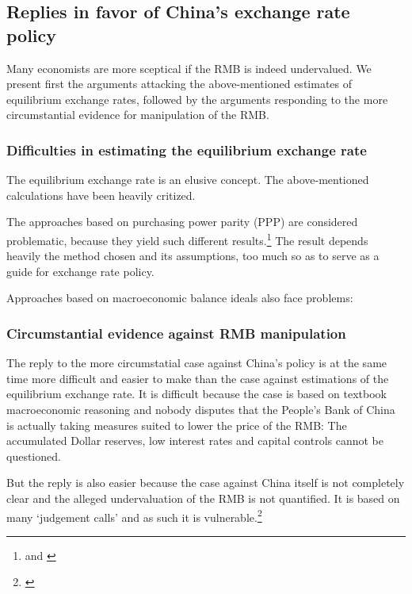 \subsection{Replies in favor of China's exchange rate policy}

Many economists are more sceptical if the RMB is indeed undervalued. We present first the arguments attacking the above-mentioned estimates of equilibrium exchange rates, followed by the arguments responding to the more circumstantial evidence for manipulation of the RMB.

\subsubsection{Difficulties in estimating the equilibrium exchange rate}

The equilibrium exchange rate is an elusive concept. The above-mentioned calculations have been heavily critized.

The approaches based on purchasing power parity (PPP) are considered problematic, because they yield such different results.\footnote{\cite[p. 16]{Yu2010} and \cite[pp. 82]{CheungChinn2010}} The result depends heavily the method chosen and its assumptions, too much so as to serve as a guide for exchange rate policy.

Approaches based on macroeconomic balance ideals also face problems: 



\subsubsection{Circumstantial evidence against RMB manipulation}

The reply to the more circumstatial case against China's policy is at the same time more difficult and easier to make than the case against estimations of the equilibrium exchange rate. It is difficult because the case is based on textbook macroeconomic reasoning and nobody disputes that the People's Bank of China is actually taking measures suited to lower the price of the RMB: The accumulated Dollar reserves, low interest rates and capital controls cannot be questioned.

But the reply is also easier because the case against China itself is not completely clear and the alleged undervaluation of the RMB is not quantified. It is based on many  `judgement calls' and as such it is vulnerable.\footnote{\cite[p. 85]{CheungChinnFujii2010}}

